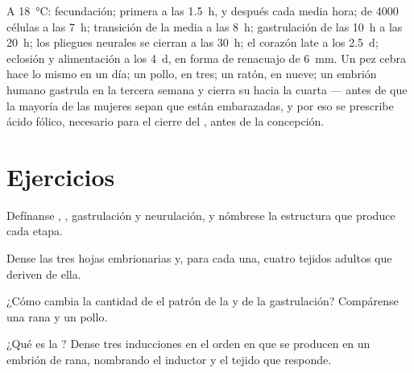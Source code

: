 \begin{example}\label{ex:b2:vertebrate-development:timetable}
A \qty{18}{\celsius}: fecundación; primera  a las
\qty{1.5}{h}, y después cada media hora;  de \num{4000} células a
las \qty{7}{h}; transición de la  media a las \qty{8}{h};
gastrulación de las \qty{10}{h} a las \qty{20}{h}; los pliegues neurales
se cierran a las \qty{30}{h}; el corazón late a los \qty{2.5}{d};
eclosión y alimentación a los \qty{4}{d}, en forma de renacuajo de
\qty{6}{mm}. Un pez cebra hace lo mismo en un día; un pollo, en tres; un
ratón, en nueve; un embrión humano gastrula en la tercera semana y cierra
su  hacia la cuarta --- antes de que la mayoría de las mujeres
sepan que están embarazadas, y por eso se prescribe ácido fólico,
necesario para el cierre del , antes de la concepción.
\end{example}

\section{Ejercicios}

\begin{exercise}[$\star$]\label{exo:b2:vertebrate-development:1}
Defínanse , , gastrulación y neurulación, y
nómbrese la estructura que produce cada etapa.
\end{exercise}

\begin{exercise}[$\star$]\label{exo:b2:vertebrate-development:2}
Dense las tres hojas embrionarias y, para cada una, cuatro tejidos adultos
que deriven de ella.
\end{exercise}

\begin{exercise}[$\star$]\label{exo:b2:vertebrate-development:3}
¿Cómo cambia la cantidad de  el patrón de la  y de la
gastrulación? Compárense una rana y un pollo.
\end{exercise}

\begin{exercise}[$\star$]\label{exo:b2:vertebrate-development:4}
¿Qué es la ? Dense tres inducciones en el orden en que se
producen en un embrión de rana, nombrando el inductor y el tejido que
responde.
\end{exercise}

